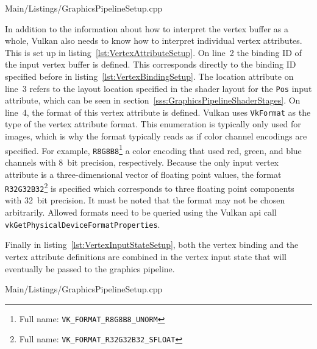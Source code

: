         
        {Main/Listings/GraphicsPipelineSetup.cpp}

        In addition to the information about how to interpret the vertex buffer as a whole, Vulkan also needs to know how to interpret individual vertex attributes.
        This is set up in listing~\ref{lst:VertexAttributeSetup}.
        On line~2 the binding ID of the input vertex buffer is defined.
        This corresponds directly to the binding ID specified before in listing~\ref{lst:VertexBindingSetup}.
        The location attribute on line~3 refers to the layout location specified in the shader layout for the \lstinline{Pos} input attribute, which can be seen in section~\ref{sss:GraphicsPipelineShaderStages}.
        On line~4, the format of this vertex attribute is defined.
        Vulkan uses \lstinline{VkFormat} as the type of the vertex attribute format.
        This enumeration is typically only used for images, which is why the format typically reads as if color channel encodings are specified.
        For example, \lstinline{R8G8B8}\footnote{Full name: \lstinline{VK_FORMAT_R8G8B8_UNORM}} a color encoding that used red, green, and blue channels with 8~bit precision, respectively.
        Because the only input vertex attribute is a three-dimensional vector of floating point values, the format \lstinline{R32G32B32}\footnote{Full name: \lstinline{VK_FORMAT_R32G32B32_SFLOAT}} is specified which corresponds to three floating point components with 32~bit precision.
        It must be noted that the format may not be chosen arbitrarily.
        Allowed formats need to be queried using the Vulkan \gls{api} call \lstinline{vkGetPhysicalDeviceFormatProperties}.

        Finally in listing~\ref{lst:VertexInputStateSetup}, both the vertex binding and the vertex attribute definitions are combined in the vertex input state that will eventually be passed to the graphics pipeline.

        
        {Main/Listings/GraphicsPipelineSetup.cpp}

